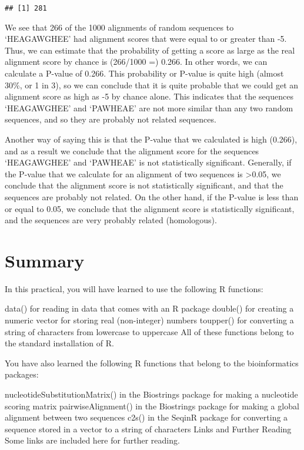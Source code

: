 \documentclass[
]{book}
\begin{document}
\begin{verbatim}
## [1] 281
\end{verbatim}

We see that 266 of the 1000 alignments of random sequences to `HEAGAWGHEE' had alignment scores that were equal to or greater than -5. Thus, we can estimate that the probability of getting a score as large as the real alignment score by chance is (266/1000 =) 0.266. In other words, we can calculate a P-value of 0.266. This probability or P-value is quite high (almost 30\%, or 1 in 3), so we can conclude that it is quite probable that we could get an alignment score as high as -5 by chance alone. This indicates that the sequences `HEAGAWGHEE' and `PAWHEAE' are not more similar than any two random sequences, and so they are probably not related sequences.

Another way of saying this is that the P-value that we calculated is high (0.266), and as a result we conclude that the alignment score for the sequences `HEAGAWGHEE' and `PAWHEAE' is not statistically significant. Generally, if the P-value that we calculate for an alignment of two sequences is \textgreater0.05, we conclude that the alignment score is not statistically significant, and that the sequences are probably not related. On the other hand, if the P-value is less than or equal to 0.05, we conclude that the alignment score is statistically significant, and the sequences are very probably related (homologous).

\hypertarget{summary-4}{%
\section{Summary}\label{summary-4}}

In this practical, you will have learned to use the following R functions:

data() for reading in data that comes with an R package
double() for creating a numeric vector for storing real (non-integer) numbers
toupper() for converting a string of characters from lowercase to uppercase
All of these functions belong to the standard installation of R.

You have also learned the following R functions that belong to the bioinformatics packages:

nucleotideSubstitutionMatrix() in the Biostrings package for making a nucleotide scoring matrix
pairwiseAlignment() in the Biostrings package for making a global alignment between two sequences
c2s() in the SeqinR package for converting a sequence stored in a vector to a string of characters
Links and Further Reading
Some links are included here for further reading.
\end{document}
